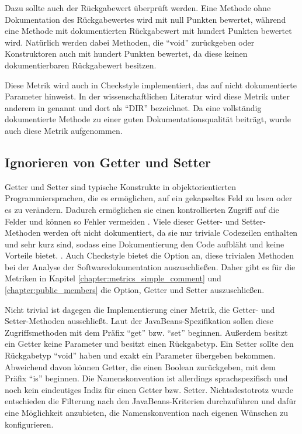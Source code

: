  Dazu sollte auch der Rückgabewert überprüft werden. Eine Methode ohne Dokumentation des Rückgabewertes wird mit null Punkten bewertet, während eine Methode mit dokumentierten Rückgabewert mit hundert Punkten bewertet wird. Natürlich werden dabei Methoden, die \enquote{void} zurückgeben oder Konstruktoren auch mit hundert Punkten bewertet, da diese keinen dokumentierbaren Rückgabewert besitzen. 
 
 Diese Metrik wird auch in Checkstyle implementiert, das auf nicht dokumentierte Parameter hinweist. In der wissenschaftlichen Literatur wird diese Metrik unter anderem in \cite[S. 5]{HowDocumentationEvolvesoverTime} genannt und dort als \enquote{DIR} bezeichnet. Da eine vollständig dokumentierte Methode zu einer guten Dokumentationsqualität beiträgt, wurde auch diese Metrik aufgenommen.

\subsection{Ignorieren von Getter und Setter }
Getter und Setter sind typische Konstrukte in objektorientierten Programmiersprachen, die es ermöglichen, auf ein gekapseltes Feld zu lesen oder es zu verändern. Dadurch ermöglichen sie einen kontrollierten Zugriff auf die Felder und können so Fehler vermeiden \cite[S. 235]{OntheUseofPropertiesinJavaApplications}. Viele dieser Getter- und Setter-Methoden werden oft nicht dokumentiert, da sie nur triviale Codezeilen enthalten und sehr kurz sind, sodass eine Dokumentierung den Code aufbläht und keine Vorteile bietet. \cite[S. 254]{JavadocViolationsandTheirEvolutioninOpen-SourceSoftware}. Auch Checkstyle bietet die Option an, diese trivialen Methoden bei der Analyse der Softwaredokumentation auszuschließen. Daher gibt es für die Metriken in Kapitel \ref{chapter:metrics_simple_comment} und \ref{chapter:public_members} die Option, Getter und Setter auszuschließen.

Nicht trivial ist dagegen die Implementierung einer Metrik, die Getter- und Setter-Methoden ausschließt. Laut der JavaBeans-Spezifikation \cite[S. 55]{javabeans} sollen diese Zugriffsmethoden mit dem Präfix \enquote{get} bzw. \enquote{set} beginnen. Außerdem besitzt ein Getter keine Parameter und besitzt einen Rückgabetyp. Ein Setter sollte den Rückgabetyp \enquote{void} haben und exakt ein Parameter übergeben bekommen. Abweichend davon können Getter, die einen Boolean zurückgeben, mit dem Präfix \enquote{is} beginnen. Die Namenskonvention ist allerdings sprachspezifisch und noch kein eindeutiges Indiz für einen Getter bzw. Setter. Nichtsdestotrotz wurde entschieden die Filterung nach den JavaBeans-Kriterien durchzuführen und dafür eine Möglichkeit anzubieten, die Namenskonvention nach eigenen Wünschen zu konfigurieren. 

